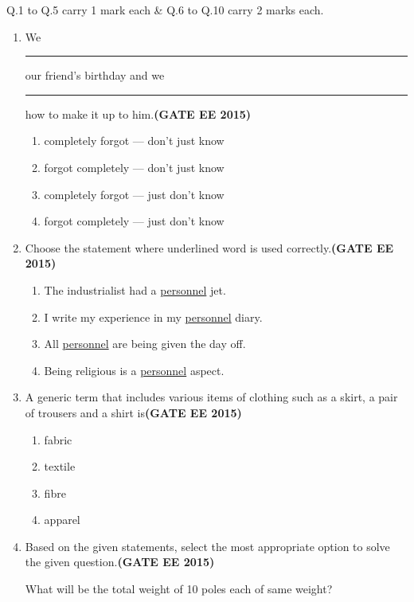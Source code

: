 \documentclass[a4paper,12pt]{exam}
\theoremstyle{remark}
\begin{document}
\vspace{0.5cm}
 Q.1 to Q.5 carry 1 mark each \& Q.6 to Q.10 carry 2 marks each.\\
 \begin{enumerate}
 \item We \rule{3cm}{0.15mm} our friend's birthday and we \rule{3cm}{0.15mm} how to make it up to him.\hfill{\textbf{(GATE EE 2015)}}
    \begin{enumerate}
        \item completely forgot --- don’t just know
        \item forgot completely --- don’t just know
        \item completely forgot --- just don’t know
        \item forgot completely --- just don’t know
    \end{enumerate}

\item Choose the statement where underlined word is used correctly.\hfill{\textbf{(GATE EE 2015)}}

\begin{enumerate}
    \item The industrialist had a \underline{personnel} jet.
    \item I write my experience in my \underline{personnel} diary.
    \item All \underline{personnel} are being given the day off.
    \item Being religious is a \underline{personnel} aspect.
\end{enumerate}

\item A generic term that includes various items of clothing such as a skirt, a pair of trousers and a shirt is\hfill{\textbf{(GATE EE 2015)}}

\begin{multicols}{4}
\begin{enumerate}
    \item fabric
    \item textile
    \item fibre
    \item apparel
\end{enumerate}
\end{multicols}
\item Based on the given statements, select the most appropriate option to solve the given question.\hfill{\textbf{(GATE EE 2015)}}

What will be the total weight of 10 poles each of same weight?


\end{enumerate}
\end{document}
